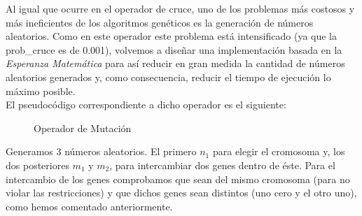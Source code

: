 Al igual que ocurre en el operador de cruce, uno de los problemas más costosos y más ineficientes de los algoritmos genéticos es la generación de números aleatorios. Como en este operador este problema está intensificado (ya que la prob\_cruce es de 0.001), volvemos a diseñar una implementación basada en la \textit{Esperanza Matemática} para así reducir en gran medida la cantidad de números aleatorios generados y, como consecuencia, reducir el tiempo de ejecución lo máximo posible.  \\


El pseudocódigo correspondiente a dicho operador es el siguiente: 


\begin{figure}[H]
	\centering
	\begin{minipage}{.9\linewidth}
		
		
		
		\begin{algorithm}[H] 
			
			
			
			\caption{Operador de Mutación}
			\SetAlgoLined
			
			
			
		\end{algorithm} 
		
	\end{minipage}
\end{figure}


Generamos 3 números aleatorios. El primero $n_1$ para elegir el cromosoma y, los dos posteriores $m_1$ y $m_2$, para intercambiar dos genes dentro de éste. Para el intercambio de los genes comprobamos que sean del mismo cromosoma (para no violar las restricciones) y que dichos genes sean distintos (uno cero y el otro uno), como hemos comentado anteriormente.

